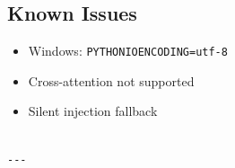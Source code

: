 \subsection{Known Issues}

\begin{itemize}
\item Windows: \texttt{PYTHONIOENCODING=utf-8}
\item Cross-attention not supported
\item Silent injection fallback
\end{itemize}
\begin{lstlisting}

---
\end{lstlisting}